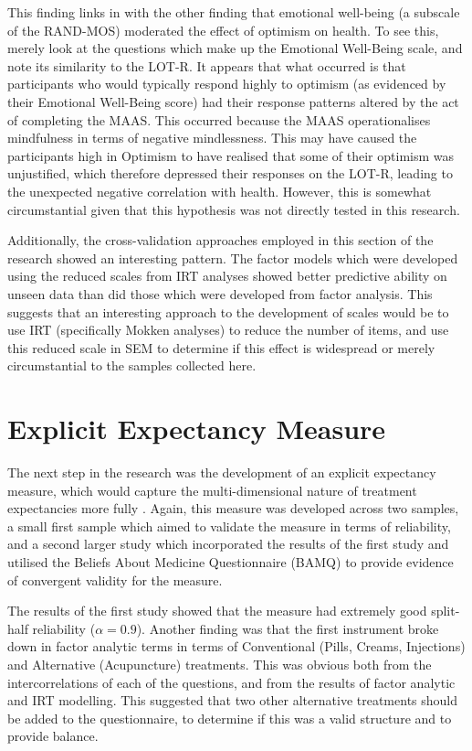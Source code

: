 This finding links in with the other finding that emotional well-being (a subscale of the RAND-MOS) moderated the effect of optimism on health. To see this, merely look at the questions which make up the Emotional Well-Being scale, and note its similarity to the LOT-R. It appears that what occurred is that participants who would typically respond highly to optimism (as evidenced by their Emotional Well-Being score) had their response patterns altered by the act of completing the MAAS. This occurred because the MAAS operationalises mindfulness in terms of negative mindlessness. This may have caused the participants high in Optimism to have realised that some of their optimism was unjustified, which therefore depressed their responses on the LOT-R, leading to the unexpected negative correlation with health. However, this is somewhat circumstantial given that this hypothesis was not directly tested in this research. 

Additionally, the cross-validation approaches employed in this section of the research showed an interesting pattern. The factor models which were developed using the reduced scales from IRT analyses showed better predictive ability on unseen data than did those which were developed from factor analysis. This suggests that an interesting approach to the development of scales would be to use IRT (specifically Mokken analyses) to reduce the number of items, and use this reduced scale in SEM to determine if this effect is widespread or merely circumstantial to the samples collected here. 

\section{Explicit Expectancy Measure}
\label{sec:expl-expect-meas}

The next step in the research was the development of an explicit expectancy measure, which would capture the multi-dimensional nature of treatment expectancies more fully \cite{Stone2005}. Again, this measure was developed across two samples, a small first sample which aimed to validate the measure in terms of reliability, and a second larger study which incorporated the results of the first study and utilised the Beliefs About Medicine Questionnaire (BAMQ) \cite{Horne1999} to provide evidence of convergent validity for the measure. 

The results of the first study showed that the measure had extremely good split-half reliability ($ \alpha=0.9$). Another finding was that the first instrument broke down in factor analytic terms in terms of Conventional (Pills, Creams, Injections) and Alternative (Acupuncture) treatments. This was obvious both from the intercorrelations of each of the questions, and from the results of factor analytic and IRT modelling. This suggested that two other alternative treatments should be added to the questionnaire, to determine if this was a valid structure and to provide balance. 

